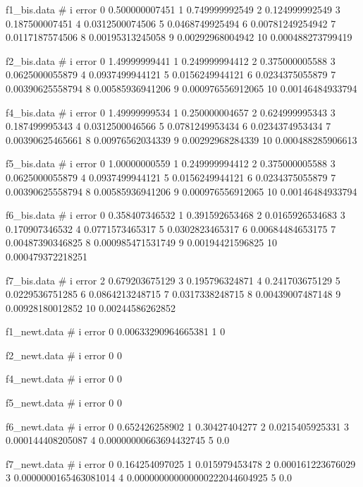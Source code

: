 \begin{filecontents}{f1_bis.data}
	# i error
	0 	0.500000007451
	1 	0.749999992549
	2 	0.124999992549
	3 	0.187500007451
	4 	0.0312500074506
	5 	0.0468749925494
	6 	0.00781249254942
	7 	0.0117187574506
	8 	0.00195313245058
	9 	0.00292968004942
	10 	0.000488273799419
\end{filecontents}
\begin{filecontents}{f2_bis.data}
	# i error
	0 	1.49999999441
	1 	0.249999994412
	2 	0.375000005588
	3 	0.0625000055879
	4 	0.0937499944121
	5 	0.0156249944121
	6 	0.0234375055879
	7 	0.00390625558794
	8 	0.00585936941206
	9 	0.000976556912065
	10 	0.00146484933794
\end{filecontents}
\begin{filecontents}{f4_bis.data}
	# i error
	0 	1.49999999534
	1 	0.250000004657
	2 	0.624999995343
	3 	0.187499995343
	4 	0.0312500046566
	5 	0.0781249953434
	6 	0.0234374953434
	7 	0.00390625465661
	8 	0.00976562034339
	9 	0.00292968284339
	10 	0.000488285906613
\end{filecontents}
\begin{filecontents}{f5_bis.data}
	# i error
	0 	1.00000000559
	1 	0.249999994412
	2 	0.375000005588
	3 	0.0625000055879
	4 	0.0937499944121
	5 	0.0156249944121
	6 	0.0234375055879
	7 	0.00390625558794
	8 	0.00585936941206
	9 	0.000976556912065
	10 	0.00146484933794
\end{filecontents}
\begin{filecontents}{f6_bis.data}
	# i error
	0 	0.358407346532
	1 	0.391592653468
	2 	0.0165926534683
	3 	0.170907346532
	4 	0.0771573465317
	5 	0.0302823465317
	6 	0.00684484653175
	7 	0.00487390346825
	8 	0.000985471531749
	9 	0.00194421596825
	10 	0.000479372218251
\end{filecontents}
\begin{filecontents}{f7_bis.data}
	# i error
	2 	0.679203675129
	3 	0.195796324871
	4 	0.241703675129
	5 	0.0229536751285
	6 	0.0864213248715
	7 	0.0317338248715
	8 	0.00439007487148
	9 	0.00928180012852
	10 	0.00244586262852
\end{filecontents}

\begin{filecontents}{f1_newt.data}
	# i error
	0 	0.00633290964665381
	1 	0
\end{filecontents}
\begin{filecontents}{f2_newt.data}
	# i error
	0 	0
\end{filecontents}
\begin{filecontents}{f4_newt.data}
	# i error
	0 	0
\end{filecontents}
\begin{filecontents}{f5_newt.data}
	# i error
	0 	0
\end{filecontents}
\begin{filecontents}{f6_newt.data}
	# i error
	0 	0.652426258902
	1 	0.30427404277
	2 	0.0215405925331
	3 	0.000144408205087
	4 	0.00000000663694432745
	5 	0.0
\end{filecontents}
\begin{filecontents}{f7_newt.data}
	# i error
	0 	0.164254097025
	1 	0.015979453478
	2 	0.000161223676029
	3 	0.0000000165463081014
	4 	0.000000000000000222044604925
	5 	0.0
\end{filecontents}
